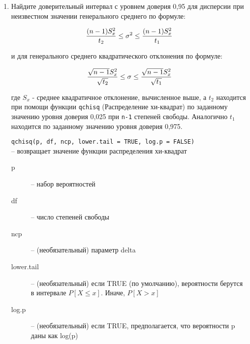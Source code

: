 \begin{enumerate}
    \item Найдите доверительный интервал с уровнем доверия 0,95 для дисперсии при неизвестном значении генерального
          среднего по формуле:

          $$ {(n-1)S_x^2 \over t_2} \leq \sigma^2 \leq {(n-1)S_x^2 \over t_1} $$ 

          и для генерального среднего квадратического отклонения по формуле:

          $$ {\sqrt{n-1}S_x^2 \over \sqrt{t_2}} \leq \sigma \leq {\sqrt{n-1}S_x^2 \over \sqrt{t_1}} $$

          где $ S_x $ - среднее квадратичное отклонение, вычисленное выше, а $ t_2 $ находится при помощи
          функции \texttt{qchisq} (Распределение хи-квадрат) по заданному значению уровня доверия 0,025 при \texttt{n-1} степеней свободы.
          Аналогично $ t_1 $ находится по заданному значению уровня доверия 0,975.

          \begin{mdframed}[style=BadassFrame]

              \texttt{qchisq(p, df, ncp, lower.tail = TRUE, log.p = FALSE)} \\ -- возвращает значение функции распределения хи-квадрат
              \begin{description}

                \item[p] -- набор вероятностей
                \item[df] -- число степеней свободы
                \item[ncp] -- (необязательный) параметр delta
                \item[lower.tail] -- (необязательный) если TRUE (по умолчанию), вероятности берутся в интервале $P[X \leq x]$. Иначе, $P[X > x]$ 
                \item[log.p] -- (необязательный) если TRUE, предполагается, что вероятности p даны как log(p)
              \end{description}
        \end{mdframed}


\end{enumerate}



